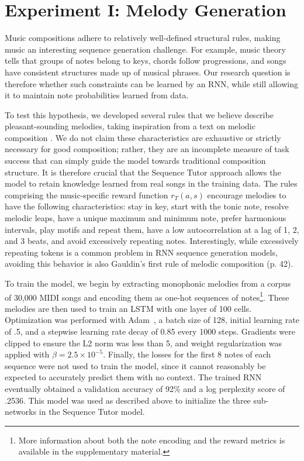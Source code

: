 \section{Experiment I: Melody Generation} Music compositions adhere to relatively well-defined structural rules, making music an interesting sequence generation challenge. For example, music theory tells that groups of notes belong to keys, chords follow progressions, and songs have consistent structures made up of musical phrases. Our research question is therefore whether such constraints can be learned by an RNN, while still allowing it to maintain note probabilities learned from data.

To test this hypothesis, we developed several rules that we believe describe pleasant-sounding melodies, taking inspiration from a text on melodic composition \citep{gauldin1995practical}. We do not claim these characteristics are exhaustive or strictly necessary for good composition; rather, they are an incomplete measure of task success that can simply guide the model towards traditional composition structure. It is therefore crucial that the Sequence Tutor approach allows the model to retain knowledge learned from real songs in the training data. The rules comprising the music-specific reward function $r_{T}(a,s)$ encourage melodies to have the following characteristics: stay in key, start with the tonic note, resolve melodic leaps, have a unique maximum and minimum note, prefer harmonious intervals, play motifs and repeat them, have a low autocorrelation at a lag of 1, 2, and 3 beats, and avoid excessively repeating notes. Interestingly, while excessively repeating tokens is a common problem in RNN sequence generation models, avoiding this behavior is also Gauldin's first rule of melodic composition (p. 42).

To train the model, we begin by extracting monophonic melodies from a corpus of 30,000 MIDI songs and encoding them as one-hot sequences of notes\footnote{More information about both the note encoding and the reward metrics is available in the supplementary material.}. These melodies are then used to train an LSTM with one layer of 100 cells. Optimization was performed with Adam~\citep{kingma2014adam}, a batch size of 128, initial learning rate of .5, and a stepwise learning rate decay of 0.85 every 1000 steps. Gradients were clipped to ensure the L2 norm was less than 5, and weight regularization was applied with $\beta=2.5 \times 10^{-5}$. Finally, the losses for the first 8 notes of each sequence were not used to train the model, since it cannot reasonably be expected to accurately predict them with no context. The trained RNN eventually obtained a validation accuracy of 92\% and a log perplexity score of .2536. This model was used as described above to initialize the three sub-networks in the Sequence Tutor model. 

